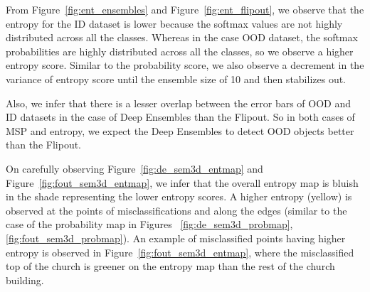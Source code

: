     From Figure~\ref{fig:ent_ensembles} and Figure~\ref{fig:ent_flipout}, we observe that the entropy for the ID dataset is lower because the softmax values are not highly distributed across all the classes.
    Whereas in the case OOD dataset, the softmax probabilities are highly distributed across all the classes, so we observe a higher entropy score.    
    Similar to the probability score, we also observe a decrement in the variance of entropy score until the ensemble size of 10 and then stabilizes out.

    Also, we infer that there is a lesser overlap between the error bars of OOD and ID datasets in the case of Deep Ensembles than the Flipout.
    So in both cases of MSP and entropy, we expect the Deep Ensembles to detect OOD objects better than the Flipout.

    On carefully observing Figure~\ref{fig:de_sem3d_entmap} and Figure~\ref{fig:fout_sem3d_entmap}, we infer that the overall entropy map is bluish in the shade representing the lower entropy scores.
    A higher entropy (yellow) is observed at the points of misclassifications and along the edges (similar to the case of the probability map in Figures ~\ref{fig:de_sem3d_probmap}, \ref{fig:fout_sem3d_probmap}).
    An example of misclassified points having higher entropy is observed in Figure~\ref{fig:fout_sem3d_entmap}, where the misclassified top of the church is greener on the entropy map than the rest of the church building.
    

